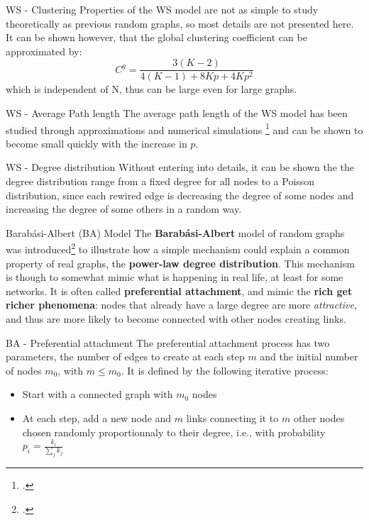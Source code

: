 \begin{textbox}{WS - Clustering}
    Properties of the WS model are not as simple to study theoretically as previous random graphs, so most details are not presented here.
    It can be shown however, that the global clustering coefficient can be approximated by:
    \[
        C^g=\frac{3(K-2)}{4(K-1)+8Kp+4Kp^2}
    \]
    which is independent of N, thus can be large even for large graphs.
\end{textbox}


\begin{textbox}{WS - Average Path length}
    The average path length of the WS model has been studied through approximations and numerical simulations \footcite{newman2000models} and can be shown to become small quickly with the increase in $p$.
\end{textbox}

\begin{textbox}{WS - Degree distribution}
    Without entering into details, it can be shown the the degree distribution range from a fixed degree for all nodes to a Poisson distribution, since each rewired edge is decreasing the degree of some nodes and increasing the degree of some others in a random way.
\end{textbox}

\begin{textbox}{Barabási-Albert (BA) Model}
    The \textbf{Barabási-Albert} model of random graphs was introduced\footcite{barabasi1999emergence} to illustrate how a simple mechanism could explain a common property of real graphs, the \textbf{power-law degree distribution}.
    This mechanism is though to somewhat mimic what is happening in real life, at least for some networks. It is often called \textbf{preferential attachment}, and mimic the \textbf{rich get richer phenomena}: nodes that already have a large degree are more \textit{attractive}, and thus are more likely to become connected with other nodes creating links.
\end{textbox}

\begin{textbox}{BA - Preferential attachment }
    The preferential attachment process has two parameters, the number of edges to create at each step $m$ and the initial number of nodes $m_0$, with $m\leq m_0$. It is defined by the following iterative process:
    \begin{itemize}
        \item Start with a connected graph with $m_0$ nodes
        \item At each step, add a new node and $m$ links connecting it to $m$ other nodes chosen randomly proportionnaly to their degree, i.e., with probability $p_i=\frac{k_i}{\sum_j k_j}$
    \end{itemize}
\end{textbox}

